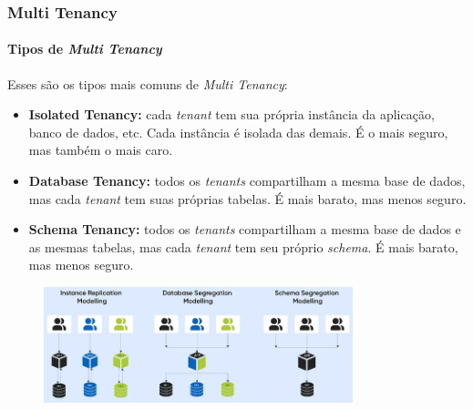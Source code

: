 \documentclass[
	9pt, %
	t, %
]{beamer}
\begin{document}
\begin{frame}
	\frametitle{Multi Tenancy}
	\framesubtitle{Tipos de \textit{Multi Tenancy}}

	Esses são os tipos mais comuns de \textit{Multi Tenancy}:

	\begin{itemize}
		\item \textbf{Isolated Tenancy:} cada \textit{tenant} tem sua própria instância da aplicação, banco de dados, etc. Cada instância é isolada das demais. É o mais seguro, mas também o mais caro.
		\item \textbf{Database Tenancy:} todos os \textit{tenants} compartilham a mesma base de dados, mas cada \textit{tenant} tem suas próprias tabelas. É mais barato, mas menos seguro.
		\item \textbf{Schema Tenancy:} todos os \textit{tenants} compartilham a mesma base de dados e as mesmas tabelas, mas cada \textit{tenant} tem seu próprio \textit{schema}. É mais barato, mas menos seguro.
	\end{itemize}

	\begin{figure}
		\centering
		\includegraphics[width=0.8\textwidth]{tenancy_types.png}
	\end{figure}

\end{frame}
\end{document}
